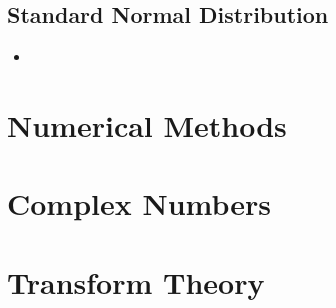 \documentclass[8pt]{report}
\begin{document}
	\section{Standard Normal Distribution}
		\begin{itemize}
				\item
			\end{itemize}\hrulefill
\chapter{Numerical Methods}
\chapter{Complex Numbers}
\chapter{Transform Theory}
\end{document}
